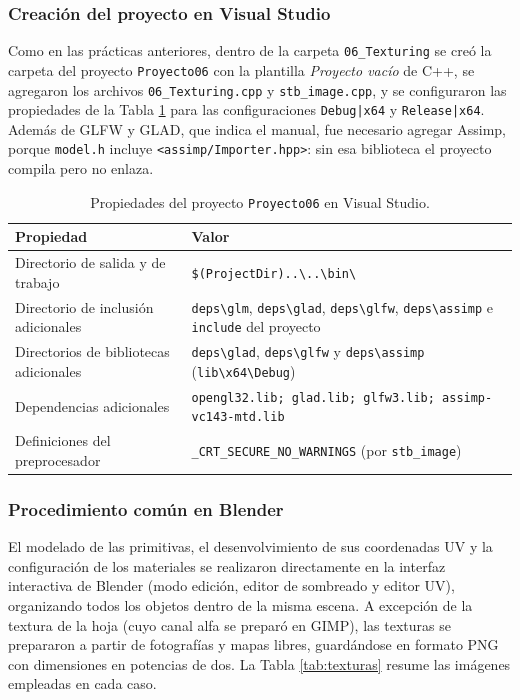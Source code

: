 \subsubsection{Creación del proyecto en Visual Studio}
Como en las prácticas anteriores, dentro de la carpeta \texttt{06\_Texturing} se creó la carpeta del proyecto \texttt{Proyecto06} con la plantilla \textit{Proyecto vacío} de C++, se agregaron los archivos \texttt{06\_Texturing.cpp} y \texttt{stb\_image.cpp}, y se configuraron las propiedades de la Tabla \ref{tab:propiedades} para las configuraciones \texttt{Debug|x64} y \texttt{Release|x64}. Además de GLFW y GLAD, que indica el manual, fue necesario agregar Assimp, porque \texttt{model.h} incluye \texttt{<assimp/Importer.hpp>}: sin esa biblioteca el proyecto compila pero no enlaza.

\begin{table}[H]
\centering
\renewcommand{\arraystretch}{1.25}
\begin{tabular}{|p{5.2cm}|p{9.5cm}|}
\hline
\textbf{Propiedad} & \textbf{Valor} \\ \hline
Directorio de salida y de trabajo & \texttt{\$(ProjectDir)..\textbackslash..\textbackslash bin\textbackslash} \\ \hline
Directorio de inclusión adicionales & \texttt{deps\textbackslash glm}, \texttt{deps\textbackslash glad}, \texttt{deps\textbackslash glfw}, \texttt{deps\textbackslash assimp} e \texttt{include} del proyecto \\ \hline
Directorios de bibliotecas adicionales & \texttt{deps\textbackslash glad}, \texttt{deps\textbackslash glfw} y \texttt{deps\textbackslash assimp} (\texttt{lib\textbackslash x64\textbackslash Debug}) \\ \hline
Dependencias adicionales & \texttt{opengl32.lib; glad.lib; glfw3.lib; assimp-vc143-mtd.lib} \\ \hline
Definiciones del preprocesador & \texttt{\_CRT\_SECURE\_NO\_WARNINGS} (por \texttt{stb\_image}) \\ \hline
\end{tabular}
\caption{Propiedades del proyecto \texttt{Proyecto06} en Visual Studio.}
\label{tab:propiedades}
\end{table}

\subsubsection{Procedimiento común en Blender}
El modelado de las primitivas, el desenvolvimiento de sus coordenadas UV y la configuración de los materiales se realizaron directamente en la interfaz interactiva de Blender (modo edición, editor de sombreado y editor UV), organizando todos los objetos dentro de la misma escena. A excepción de la textura de la hoja (cuyo canal alfa se preparó en GIMP), las texturas se prepararon a partir de fotografías y mapas libres, guardándose en formato PNG con dimensiones en potencias de dos. La Tabla \ref{tab:texturas} resume las imágenes empleadas en cada caso.

